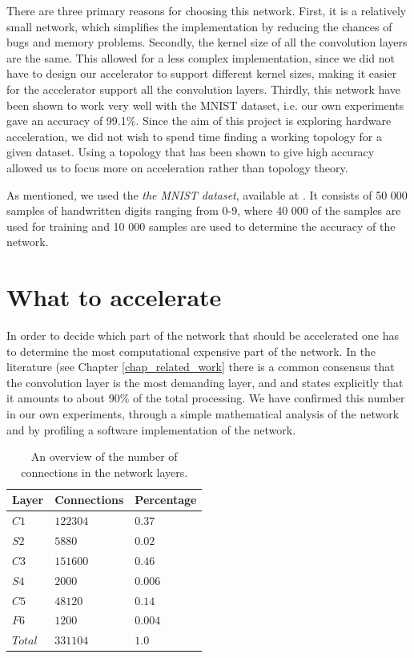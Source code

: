 There are three primary reasons for choosing this network. First, it is a relatively small network, which simplifies the implementation by reducing the chances of bugs and memory problems. Secondly, the kernel size of all the convolution layers are the same. This allowed for a less complex implementation, since we did not have to design our accelerator to support different kernel sizes, making it easier for the accelerator support all the convolution layers. Thirdly, this network have been shown to work very well with the MNIST dataset, i.e. our own experiments gave an accuracy of 99.1\%. Since the aim of this project is exploring hardware acceleration, we did not wish to spend time finding a working topology for a given dataset. Using a topology that has been shown to give high accuracy allowed us to focus more on acceleration rather than topology theory.   

 As mentioned, we used the \textit{the MNIST dataset}, available at \cite{LeCun1998a}. It consists of 50 000 samples of handwritten digits ranging from 0-9, where 40 000 of the samples are used for
training and 10 000 samples are used to determine the accuracy of the network. 

\section{What to accelerate} \label{sec_what_to_accelerate}

In order to decide which part of the network that should be accelerated one has to determine the most computational expensive part of the network. In the literature (see Chapter \ref{chap_related_work} there is a common consensus that the convolution layer is the most demanding layer, and \cite{Farabet2010} and \cite{Zhang2015} states explicitly that it amounts to about 90\% of the total processing. We have confirmed this number in our own experiments, through a simple mathematical analysis of the network and by profiling a software implementation of the network. 

\begin{table}
	\centering
    \begin{tabular}{| >{\centering\arraybackslash}m{0.8in} | >{\centering\arraybackslash}m{1.0in} | >{\centering\arraybackslash}m{1.0in} |}
    \hline
    Layer & Connections & Percentage  \\ \hline
    $ C1 $ & $ 122304 $ & $ 0.37 $ \\ \hline
    $ S2 $ & $ 5880  $ & $ 0.02 $ \\ \hline
    $ C3 $ & $ 151600 $ & $ 0.46 $  \\ \hline
    $ S4 $ & $ 2000 $ & $ 0.006 $ \\ \hline
    $ C5 $ & $ 48120 $ & $ 0.14 $  \\ \hline
    $ F6 $ & $ 1200 $ & $ 0.004 $ \\ \hline
    $ Total $ & $ 331104 $ & $ 1.0 $  \\ \hline
        \end{tabular}
    \caption{An overview of the number of connections in the network layers.}
   	\label{tab_nofOps}
\end{table}

